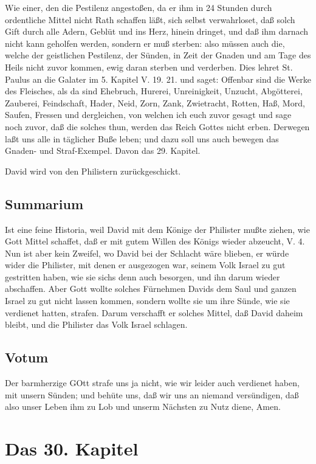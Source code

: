 Wie einer, den die Pestilenz angestoßen, da er ihm in 24 Stunden durch ordentliche Mittel nicht Rath schaffen läßt, sich selbst verwahrloset, daß solch Gift durch alle Adern, Geblüt und ins Herz, hinein dringet, und daß ihm darnach nicht kann geholfen werden, sondern er muß sterben: also müssen auch die, welche der geistlichen Pestilenz, der Sünden, in Zeit der Gnaden und am Tage des Heils nicht zuvor kommen, ewig daran sterben und verderben. Dies lehret St. Paulus an die Galater im 5. Kapitel V. 19. 21. und saget: Offenbar sind die Werke des Fleisches, als da sind Ehebruch, Hurerei, Unreinigkeit, Unzucht, Abgötterei, Zauberei, Feindschaft, Hader, Neid, Zorn, Zank, Zwietracht, Rotten, Haß, Mord, Saufen, Fressen und dergleichen, von welchen ich euch zuvor gesagt und sage noch zuvor, daß die solches thun, werden das Reich Gottes nicht erben. Derwegen laßt uns alle in täglicher Buße leben; und dazu soll uns auch bewegen das Gnaden- und Straf-Exempel. Davon das 29. Kapitel.

David wird von den Philistern zurückgeschickt.

\section{Summarium}

Ist eine feine Historia, weil David mit dem Könige der Philister mußte ziehen, wie Gott Mittel schaffet, daß er mit gutem Willen des Königs wieder abzeucht, V. 4. Nun ist aber kein Zweifel, wo David bei der Schlacht wäre blieben, er würde wider die Philister, mit denen er ausgezogen war, seinem Volk Israel zu gut gestritten haben, wie sie sichs denn auch besorgen, und ihn darum wieder abschaffen. Aber Gott wollte solches Fürnehmen Davids dem Saul und ganzen Israel zu gut nicht lassen kommen, sondern wollte sie um ihre Sünde, wie sie verdienet hatten, strafen. Darum verschafft er solches Mittel, daß David daheim bleibt, und die Philister das Volk Israel schlagen.

\section{Votum}

Der barmherzige GOtt strafe uns ja nicht, wie wir leider auch verdienet haben, mit unsern Sünden; und behüte uns, daß wir uns an niemand versündigen, daß also unser Leben ihm zu Lob und unserm Nächsten zu Nutz diene, Amen.

\chapter{Das 30. Kapitel}

